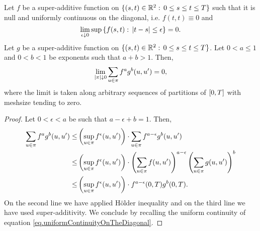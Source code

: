 \documentclass[10pt,a4paper]{article}
\begin{document}
\begin{appendices}
\begin{lemma}\label{lemma.noCorrectionTermsInIntegrationByParts}
Let $f$ be a super-additive   function on $\lbrace (s,t) \in \mathbb{R}^{2}:\, 0 \leq s \leq t \leq T \rbrace$ such that it is null and uniformly continuous on the diagonal, i.e. $f(t,t) \equiv 0$ and 
	\begin{equation}\label{eq.uniformContinuityOnTheDiagonal}
	\lim_{\epsilon\downarrow 0} \sup \left\lbrace f(s,t): \, \left\lvert {t-s} \right\rvert \leq \epsilon\right\rbrace
	=0.
	\end{equation}
Let $g$ be a  super-additive function on $\lbrace (s,t) \in \mathbb{R}^{2}:\, 0 \leq s \leq t \leq T \rbrace$. Let $0< a \leq 1$ and $0<b<1$ be exponents such that $a+b>1$. Then,
 \begin{equation*}
 \lim_{\left\lvert {\pi} \right\rvert\downarrow 0 } \sum_{u\in\pi} f^{a} g^{b} (u,u^{\prime}) = 0, 
 \end{equation*}
 where the limit is taken along arbitrary sequences of partitions of ${[0,T]}$  with meshsize tending to zero. 
\end{lemma}
\begin{proof}
Let $0<\epsilon<a$ be such that $a-\epsilon + b =1$. Then,
\begin{equation*}
\begin{split}
\sum_{u\in\pi} f^a g^b (u,u^{\prime}) \leq  & 
\left(\sup_{u\in\pi} f ^{\epsilon} (u,u^{\prime})\right) 
\cdot 
\sum_{u\in\pi} f^{a-\epsilon}g^{b} (u,u^{\prime}) \\
\leq & 
\left(\sup_{u\in\pi} f ^{\epsilon} (u,u^{\prime})\right) 
\cdot 
\left( 
	\sum_{u\in\pi} f(u,u^{\prime}) 
\right)^{a-\epsilon}
\left( 
\sum_{u\in\pi} g(u,u^{\prime}) 
\right)^{b} \\
\leq & 
\left(\sup_{u\in\pi} f ^{\epsilon} (u,u^{\prime})\right) 
\cdot f^{a-\epsilon}(0,T) g^{b}(0,T). 
\end{split}
\end{equation*}
On the second line we have applied H\"older inequality and on the third line we have used super-additivity. We conclude by recalling the uniform continuity of equation \eqref{eq.uniformContinuityOnTheDiagonal}. 
\end{proof}


\end{appendices}
\end{document}
